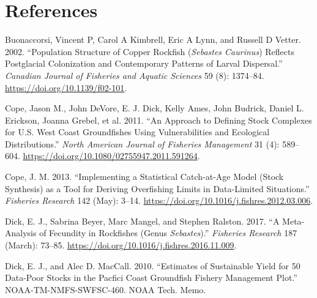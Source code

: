 \documentclass[11pt,
  english,
  a4paper,
]{article}
\begin{document}
\leavevmode\tagmcend\tagstructend\par

\clearpage


\hypertarget{references}{%
\section{References}\label{references}}

\leavevmode\tagmcend\tagstructend


\hypertarget{refs}{}
\leavevmode\hypertarget{ref-buonaccorsi_population_2002}{}%
Buonaccorsi, Vincent P, Carol A Kimbrell, Eric A Lynn, and Russell D Vetter. 2002. ``Population Structure of Copper Rockfish (\emph{Sebastes Caurinus}) Reflects Postglacial Colonization and Contemporary Patterns of Larval Dispersal.'' \emph{Canadian Journal of Fisheries and Aquatic Sciences} 59 (8): 1374--84. \url{https://doi.org/10.1139/f02-101}.

\leavevmode\hypertarget{ref-cope_approach_2011}{}%
Cope, Jason M., John DeVore, E. J. Dick, Kelly Ames, John Budrick, Daniel L. Erickson, Joanna Grebel, et al. 2011. ``An Approach to Defining Stock Complexes for U.S. West Coast Groundfishes Using Vulnerabilities and Ecological Distributions.'' \emph{North American Journal of Fisheries Management} 31 (4): 589--604. \url{https://doi.org/10.1080/02755947.2011.591264}.

\leavevmode\hypertarget{ref-cope_implementing_2013}{}%
Cope, J. M. 2013. ``Implementing a Statistical Catch-at-Age Model (Stock Synthesis) as a Tool for Deriving Overfishing Limits in Data-Limited Situations.'' \emph{Fisheries Research} 142 (May): 3--14. \url{https://doi.org/10.1016/j.fishres.2012.03.006}.

\leavevmode\hypertarget{ref-dick_meta-analysis_2017}{}%
Dick, E. J., Sabrina Beyer, Marc Mangel, and Stephen Ralston. 2017. ``A Meta-Analysis of Fecundity in Rockfishes (Genus \emph{Sebastes}).'' \emph{Fisheries Research} 187 (March): 73--85. \url{https://doi.org/10.1016/j.fishres.2016.11.009}.

\leavevmode\hypertarget{ref-DickandMacCall_dbsra_2010}{}%
Dick, E. J., and Alec D. MacCall. 2010. ``Estimates of Sustainable Yield for 50 Data-Poor Stocks in the Pacfici Coast Groundfish Fishery Management Plot.'' NOAA-TM-NMFS-SWFSC-460. NOAA Tech. Memo.
\end{document}
